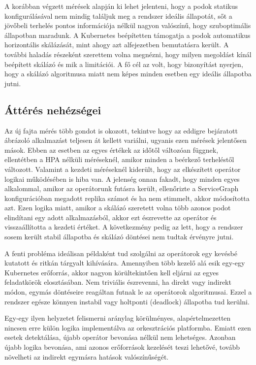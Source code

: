 A korábban végzett mérések alapján ki lehet jelenteni, hogy a podok statikus konfigurálásával nem mindig találjuk meg a rendszer ideális állapotát,  sőt a jövőbeli terhelés pontos információja nélkül nagyon valószínű, hogy szuboptimális állapotban maradunk.
A Kubernetes beépítetten támogatja a podok automatikus horizontális skálázását, mint ahogy azt  alfejezetben bemutatásra került.
A további haladás részeként szerettem volna megnézni, hogy milyen megoldást kínál beépített skálázó és mik a limitációi.
A fő cél az volt, hogy bizonyítást nyerjen, hogy a skálázó algoritmusa miatt nem képes minden esetben egy ideális állapotba jutni.

\subsection{Áttérés nehézségei}

Az új fajta mérés több gondot is okozott, tekintve hogy az eddigre bejáratott ábrázoló alkalmazást teljesen át kellett variálni, ugyanis ezen mérések jelentősen mások.
Ebben az esetben az egyes értékek az időtől változóan függnek, ellentétben a HPA nélküli méréseknél, amikor minden a beérkező terheléstől változott. Valamint a kezdeti méréseknél kiderült, hogy az elkészített operátor logikai működésében is hiba van. 
A jelenség onnan fakadt, hogy minden egyes alkalommal, amikor az operátorunk futásra került, ellenőrizte a ServiceGraph konfigurációban megadott replika számot és ha nem stimmelt, akkor módosította azt.
Ezen logika miatt, amikor a skálázó szeretett volna több azonos podot elindítani egy adott alkalmazásból, akkor ezt észrevette az operátor és visszaállította a kezdeti értéket.
A következmény pedig az lett, hogy a rendszer sosem került stabil állapotba és skálázó döntései nem tudtak érvényre jutni.

A fenti probléma ideálisan példaként tud szolgálni az operátorok egy kevésbé kutatott és ritkán tárgyalt kihívására.
Amennyiben több kezelő alá esik egy-egy Kubernetes erőforrás, akkor nagyon körültekintően kell eljárni az egyes feladatkörök elosztásában.
Nem triviális észrevenni, ha direkt vagy indirekt módon, egymás döntéseire reagáltan futnak le az operátorok algoritmusai.
Ezzel a rendszer egésze könnyen instabil vagy holtponti (deadlock) állapotba tud kerülni.

Egy-egy ilyen helyzetet felismerni aránylag körülményes, alapértelmezetten nincsen erre külön logika implementálva az orkesztrációs platformba.
Emiatt ezen esetek detektálása, újabb operátor bevonása nélkül nem lehetséges.
Azonban újabb logika bevonása, ami azonos erőforrások kezelését teszi lehetővé, tovább növelheti az indirekt egymásra hatások valószínűségét.

